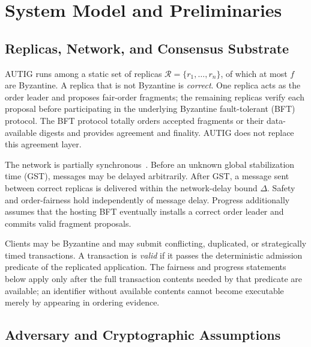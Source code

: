 
\section{System Model and Preliminaries}
\label{sec:model}

\subsection{Replicas, Network, and Consensus Substrate}

AUTIG runs among a static set of replicas
$\mathcal R=\{r_1,\ldots,r_n\}$, of which at most $f$ are Byzantine.  A
replica that is not Byzantine is \emph{correct}.  One replica acts as the
order leader and proposes fair-order fragments; the remaining replicas verify
each proposal before participating in the underlying Byzantine fault-tolerant
(BFT) protocol.  The BFT protocol totally orders accepted fragments or their
data-available digests and provides agreement and finality.  AUTIG does not
replace this agreement layer.

The network is partially synchronous~\cite{dwork1988consensus}.  Before an
unknown global stabilization time (GST), messages may be delayed arbitrarily.
After GST, a message sent between correct replicas is delivered within the
network-delay bound $\Delta$.  Safety and order-fairness hold independently of
message delay.  Progress additionally assumes that the hosting BFT eventually
installs a correct order leader and commits valid fragment proposals.

Clients may be Byzantine and may submit conflicting, duplicated, or
strategically timed transactions.  A transaction is \emph{valid} if it passes
the deterministic admission predicate of the replicated application.  The
fairness and progress statements below apply only after the full transaction
contents needed by that predicate are available; an identifier without
available contents cannot become executable merely by appearing in ordering
evidence.

\subsection{Adversary and Cryptographic Assumptions}

